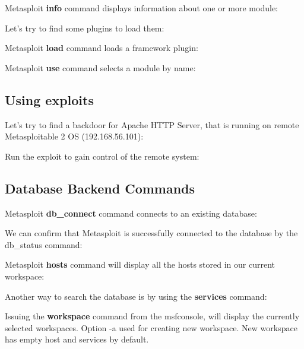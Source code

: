 \documentclass[14pt,a4paper,report]{report}
\begin{document}


Metasploit \textbf{info} command displays information about one or more module:



\clearpage

Let's try to find some plugins to load them:



Metasploit \textbf{load} command loads a framework plugin:



Metasploit \textbf{use} command selects a module by name:



\subsection{Using exploits}

Let's try to find a backdoor for Apache HTTP Server, that is running on remote Metasploitable 2 OS (192.168.56.101):



Run the exploit to gain control of the remote system:



\subsection{Database Backend Commands}

Metasploit \textbf{db\_connect} command connects to an existing database:



We can confirm that Metasploit is successfully connected to the database by the db\_status command:



Metasploit \textbf{hosts} command will display all the hosts stored in our current workspace:



Another way to search the database is by using the \textbf{services} command:



Issuing the \textbf{workspace} command from the msfconsole, will display the currently selected workspaces. Option -a used for creating new workspace. New workspace has empty host and services by default.
\end{document}
